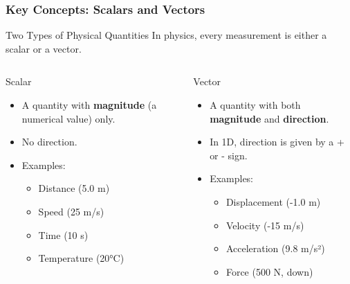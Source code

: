 \documentclass{beamer}
\begin{document}
\begin{frame}
\frametitle{Key Concepts: Scalars and Vectors}
\begin{block}{Two Types of Physical Quantities}
In physics, every measurement is either a scalar or a vector.
\end{block}
\begin{columns}[T]
    \begin{column}{0.5\textwidth}
        \alert{Scalar}
        \begin{itemize}
            \item A quantity with \textbf{magnitude} (a numerical value) only.
            \item No direction.
            \item Examples:
            \begin{itemize}
                \item Distance (5.0 m)
                \item Speed (25 m/s)
                \item Time (10 s)
                \item Temperature (20°C)
            \end{itemize}
        \end{itemize}
    \end{column}
    \begin{column}{0.5\textwidth}
        \alert{Vector}
        \begin{itemize}
            \item A quantity with both \textbf{magnitude} and \textbf{direction}.
            \item In 1D, direction is given by a + or - sign.
            \item Examples:
            \begin{itemize}
                \item Displacement (-1.0 m)
                \item Velocity (-15 m/s)
                \item Acceleration (9.8 m/s²)
                \item Force (500 N, down)
            \end{itemize}
        \end{itemize}
    \end{column}
\end{columns}
\end{frame}
\end{document}
